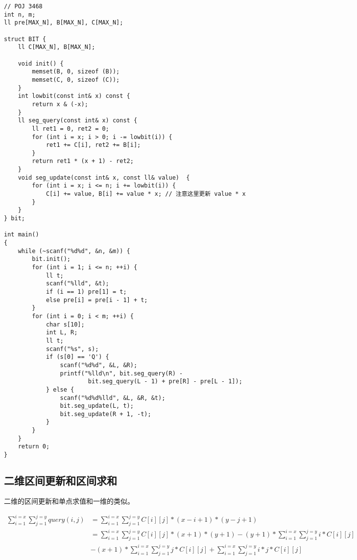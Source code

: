 \begin{lstlisting}
// POJ 3468
int n, m;
ll pre[MAX_N], B[MAX_N], C[MAX_N];

struct BIT {
	ll C[MAX_N], B[MAX_N];

	void init() {
		memset(B, 0, sizeof (B));
		memset(C, 0, sizeof (C));
	}
	int lowbit(const int& x) const {
		return x & (-x);
	}
	ll seg_query(const int& x) const {
		ll ret1 = 0, ret2 = 0;
		for (int i = x; i > 0; i -= lowbit(i)) {
			ret1 += C[i], ret2 += B[i];
		}
		return ret1 * (x + 1) - ret2;
	}
	void seg_update(const int& x, const ll& value)  {
		for (int i = x; i <= n; i += lowbit(i)) {
			C[i] += value, B[i] += value * x; // 注意这里更新 value * x
		}
	}
} bit;

int main()
{
	while (~scanf("%d%d", &n, &m)) {
		bit.init();
		for (int i = 1; i <= n; ++i) {
			ll t;
			scanf("%lld", &t);
			if (i == 1) pre[1] = t;
			else pre[i] = pre[i - 1] + t;
		}
		for (int i = 0; i < m; ++i) {
			char s[10];
			int L, R;
			ll t;
			scanf("%s", s);
			if (s[0] == 'Q') {
				scanf("%d%d", &L, &R);
				printf("%lld\n", bit.seg_query(R) -
                        bit.seg_query(L - 1) + pre[R] - pre[L - 1]);
			} else {
				scanf("%d%d%lld", &L, &R, &t);
				bit.seg_update(L, t);
				bit.seg_update(R + 1, -t);
			}
		}
	}
	return 0;
}
\end{lstlisting}

\subsection{二维区间更新和区间求和}
二维的区间更新和单点求值和一维的类似。

$$
\begin{aligned}
\sum_{i=1}^{i=x}\sum_{j=1}^{j=y}{query(i,j)}
&=\sum_{i=1}^{i=x}\sum_{j=1}^{j=y}{C[i][j]*(x-i+1)*(y-j+1)} \\
&=\sum_{i=1}^{i=x}\sum_{j=1}^{j=y}{C[i][j]*(x+1)*(y+1)} -(y+1)*\sum_{i=1}^{i=x}\sum_{j=1}^{j=y}{i*C[i][j]} \\
&-(x+1)*\sum_{i=1}^{i=x}\sum_{j=1}^{j=y}{j * C[i][j]} +\sum_{i=1}^{i=x}\sum_{j=1}^{j=y}{i*j*C[i][j]}
\end{aligned}
$$


